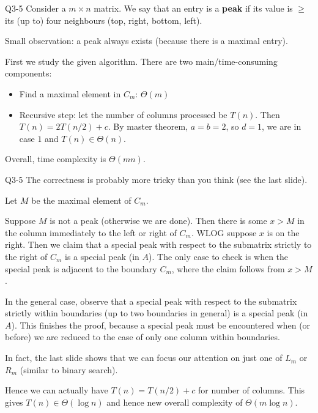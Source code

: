 \documentclass[t]{beamer}
\def\ge{\geqslant}
\begin{document}
\begin{frame}{Q3-5}
  Consider a $m \times n$ matrix. We say that an entry is a \textbf{peak} if its value is $\ge$ its (up to) four neighbours (top, right, bottom, left). 
  \par Small observation: a peak always exists (because there is a maximal entry). 
  \par First we study the given algorithm. There are two main/time-consuming components: 
  \begin{itemize}
    \item Find a maximal element in $C_m$: $\Theta(m)$
    \item Recursive step: let the number of columns processed be $T(n)$. Then $T(n) = 2T(n/2)+c$. By master theorem, $a=b=2$, so $d=1$, we are in case $1$ and $T(n) \in \Theta(n)$. 
  \end{itemize}
  Overall, time complexity is $\Theta(mn)$. 
\end{frame}
\begin{frame}{Q3-5}
  The correctness is probably more tricky than you think (see the last slide). 
  \par Let $M$ be the maximal element of $C_m$. 
  \par Suppose $M$ is not a peak (otherwise we are done). Then there is some $x > M$ in the column immediately to the left or right of $C_m$. WLOG suppose $x$ is on the right. Then we claim that a special peak with respect to the submatrix strictly to the right of $C_m$ is a special peak (in $A$). The only case to check is when the special peak is adjacent to the boundary $C_m$, where the claim follows from $x>M$. 
  \par In the general case, observe that a special peak with respect to the submatrix strictly within boundaries (up to two boundaries in general) is a special peak (in $A$). This finishes the proof, because a special peak must be encountered when (or before) we are reduced to the case of only one column within boundaries. 
\end{frame}
\begin{frame}
  In fact, the last slide shows that we can focus our attention on just one of $L_m$ or $R_m$ (similar to binary search). 
  \par Hence we can actually have $T(n) = T(n/2)+c$ for number of columns. This gives $T(n) \in \Theta(\log{n})$ and hence new overall complexity of $\Theta(m\log{n})$. 
\end{frame}
\end{document}
